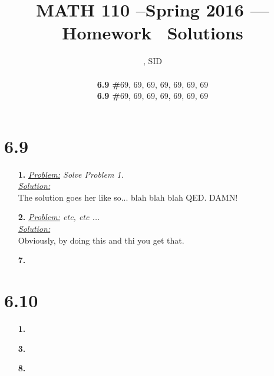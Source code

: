 \documentclass[11pt, fleqn]{article}
\title{MATH 110 --Spring 2016 --- Homework \Homework\ Solutions}
\author{\large{\Name, SID \SID}\\\small{\parbox{0cm}{\begin{tabbing}\textbf{6.9 \#}69, 69, 69, 69, 69, 69, 69\\\textbf{6.9 \#}69, 69, 69, 69, 69, 69, 69\end{tabbing}}}}
\date{}
\begin{document}
\maketitle
\section*{6.9}
\begin{itemize}
    \setlength\itemsep{5ex}
    \item [\textbf{1.}]
    \textit{\underline{Problem:} Solve Problem 1.}\\[2ex]\textit{\underline{Solution:}}\\
        The solution goes her like so... blah blah blah QED. DAMN!
    
    \item [\textbf{2.}]
    \textit{\underline{Problem:} etc, etc ...}\\[2ex]\textit{\underline{Solution:}}\\
        Obviously, by doing this and thi you get that. 
    
    \item [\textbf{7.}]
\end{itemize}

\section*{6.10}
\begin{itemize}
    \setlength\itemsep{5ex}
    \item [\textbf{1.}]
    \item [\textbf{3.}]
    \item [\textbf{8.}]
\end{itemize}
\end{document}
